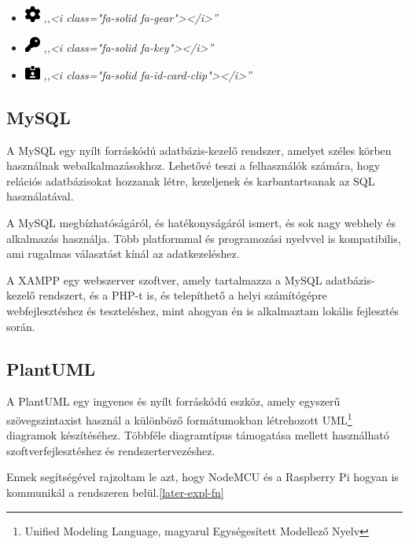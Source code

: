 \documentclass[
]{thesis-ekf}
\theoremstyle{definition}
\theoremstyle{remark}
\begin{document}
\begin{itemize}
		\item \includegraphics[width=0.5cm]{./img/gear-solid}
			\emph{,,<i class="fa-solid fa-gear"></i>''}
			
		\item \includegraphics[width=0.5cm]{./img/key-solid}
			\emph{,,<i class="fa-solid fa-key"></i>''}
			
		\item \includegraphics[width=0.5cm]{./img/id-card-clip-solid}
			\emph{,,<i class="fa-solid fa-id-card-clip"></i>''}
			
	\end{itemize}
	\subsection{MySQL}
	A MySQL egy nyílt forráskódú adatbázis-kezelő rendszer, amelyet széles körben használnak webalkalmazásokhoz. Lehetővé teszi a felhasználók számára, hogy relációs adatbázisokat hozzanak létre, kezeljenek és karbantartsanak az SQL használatával. 
	
	A MySQL megbízhatóságáról, és hatékonyságáról ismert, és sok nagy webhely és alkalmazás használja. Több platformmal és programozási nyelvvel is kompatibilis, ami rugalmas választást kínál az adatkezeléshez.
	
	A XAMPP egy webszerver szoftver, amely tartalmazza a MySQL adatbázis-kezelő rendszert, és a PHP-t is, és telepíthető a helyi számítógépre webfejlesztéshez és teszteléshez, mint ahogyan én is alkalmaztam lokális fejlesztés során.
	\subsection{PlantUML}
	A PlantUML egy ingyenes és nyílt forráskódú eszköz, amely egyszerű szövegszintaxist használ a különböző formátumokban létrehozott UML\footnote{Unified Modeling Language, magyarul Egységesített Modellező Nyelv} diagramok készítéséhez. Többféle diagramtípus támogatása mellett használható szoftverfejlesztéshez és rendszertervezéshez.

	Ennek segítségével rajzoltam le azt, hogy NodeMCU és a Raspberry Pi hogyan is kommunikál a rendszeren belül.\ref{later-expl-fn}
\end{document}
